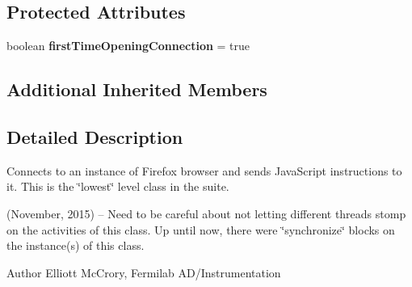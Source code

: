 \subsection*{Protected Attributes}
\begin{DoxyCompactItemize}
\item 
\hypertarget{classgov_1_1fnal_1_1ppd_1_1dd_1_1display_1_1client_1_1ConnectionToFirefoxInstance_a7d166a50f6496c51111a8454e3bb1791}{boolean {\bfseries first\-Time\-Opening\-Connection} = true}\label{classgov_1_1fnal_1_1ppd_1_1dd_1_1display_1_1client_1_1ConnectionToFirefoxInstance_a7d166a50f6496c51111a8454e3bb1791}

\end{DoxyCompactItemize}
\subsection*{Additional Inherited Members}


\subsection{Detailed Description}
Connects to an instance of Firefox browser and sends Java\-Script instructions to it. This is the \char`\"{}lowest\char`\"{} level class in the suite.

(November, 2015) -- Need to be careful about not letting different threads stomp on the activities of this class. Up until now, there were \char`\"{}synchronize\char`\"{} blocks on the instance(s) of this class.

\begin{DoxyAuthor}{Author}
Elliott Mc\-Crory, Fermilab A\-D/\-Instrumentation 
\end{DoxyAuthor}


